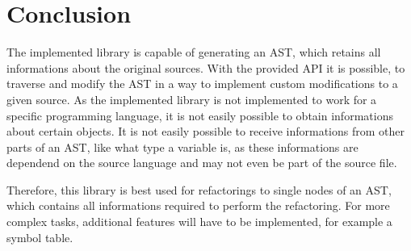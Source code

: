 \section{Conclusion}

The implemented library is capable of generating an AST, which retains all informations about the original sources.
With the provided API it is possible, to traverse and modify the AST in a way to implement custom modifications to
a given source.
As the implemented library is not implemented to work for a specific programming language, it is not easily possible
to obtain informations about certain objects.
It is not easily possible to receive informations from other parts of an AST, like what type a
variable is, as these informations are dependend on the source language and may not even be part of the source file.

Therefore, this library is best used for refactorings to single nodes of an AST, which contains all informations required
to perform the refactoring. For more complex tasks, additional features will have to be implemented, for example a symbol
table. 